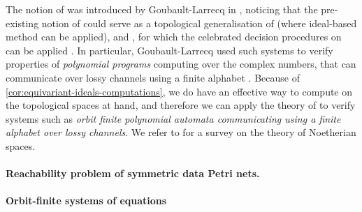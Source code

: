 \begin{remark}
  \label{rem:topological-wsts}
  The notion of
   was introduced by
  Goubault-Larrecq in \cite{JGL07}, noticing that the pre-existing notion of
   could serve as a topological generalisation of
   (where ideal-based method can be applied),
  and 
  , for which the celebrated decision procedures on
   can be applied \cite{ABDU96}. In particular,
  Goubault-Larrecq used such systems to verify properties of \emph{polynomial
  programs} computing over the complex numbers, that can communicate over lossy
  channels using a finite alphabet \cite{JGL10}. 
  Because of \cref{cor:equivariant-ideals-computations}, we do have an 
  effective way to compute on the topological spaces at hand, 
  and therefore we can apply the theory of
   to verify systems
  such as \emph{orbit finite polynomial automata communicating using a finite alphabet
  over lossy channels}.
  We refer to \cite[Chapter 9]{JGL13} for a survey on the theory of 
  Noetherian spaces.
\end{remark}

\paragraph{Reachability problem of symmetric data Petri nets.}


\paragraph{Orbit-finite systems of equations}


